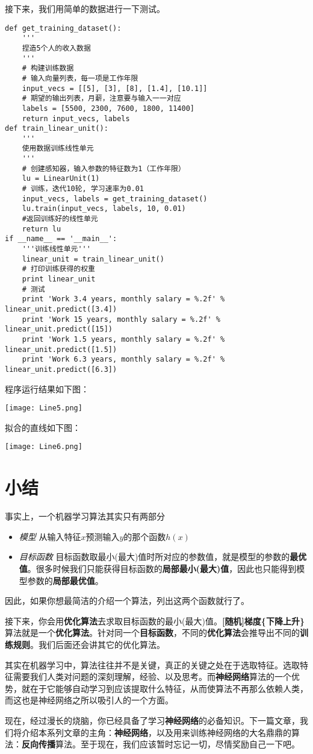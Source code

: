 接下来，我们用简单的数据进行一下测试。
\begin{lstlisting}
def get_training_dataset():
    '''
    捏造5个人的收入数据
    '''
    # 构建训练数据
    # 输入向量列表，每一项是工作年限
    input_vecs = [[5], [3], [8], [1.4], [10.1]]
    # 期望的输出列表，月薪，注意要与输入一一对应
    labels = [5500, 2300, 7600, 1800, 11400]
    return input_vecs, labels    
def train_linear_unit():
    '''
    使用数据训练线性单元
    '''
    # 创建感知器，输入参数的特征数为1（工作年限）
    lu = LinearUnit(1)
    # 训练，迭代10轮, 学习速率为0.01
    input_vecs, labels = get_training_dataset()
    lu.train(input_vecs, labels, 10, 0.01)
    #返回训练好的线性单元
    return lu
if __name__ == '__main__': 
    '''训练线性单元'''
    linear_unit = train_linear_unit()
    # 打印训练获得的权重
    print linear_unit
    # 测试
    print 'Work 3.4 years, monthly salary = %.2f' % linear_unit.predict([3.4])
    print 'Work 15 years, monthly salary = %.2f' % linear_unit.predict([15])
    print 'Work 1.5 years, monthly salary = %.2f' % linear_unit.predict([1.5])
    print 'Work 6.3 years, monthly salary = %.2f' % linear_unit.predict([6.3])
\end{lstlisting}

程序运行结果如下图：

\texttt{[image: Line5.png]}


拟合的直线如下图：

\texttt{[image: Line6.png]}


\section{小结}

事实上，一个机器学习算法其实只有两部分

\begin{itemize}
	\item
	      \emph{模型} 从输入特征\({x}\)预测输入\(y\)的那个函数\(h(x)\)
	\item
	      \emph{目标函数} 目标函数取最小(最大)值时所对应的参数值，就是模型的参数的\textbf{最优值}。很多时候我们只能获得目标函数的\textbf{局部最小(最大)值}，因此也只能得到模型参数的\textbf{局部最优值}。
\end{itemize}

因此，如果你想最简洁的介绍一个算法，列出这两个函数就行了。

接下来，你会用\textbf{优化算法}去求取目标函数的最小(最大)值。\textbf{{[}随机{]}梯度\{下降\textbar 上升\}}算法就是一个\textbf{优化算法}。针对同一个\textbf{目标函数}，不同的\textbf{优化算法}会推导出不同的\textbf{训练规则}。我们后面还会讲其它的优化算法。

其实在机器学习中，算法往往并不是关键，真正的关键之处在于选取特征。选取特征需要我们人类对问题的深刻理解，经验、以及思考。而\textbf{神经网络}算法的一个优势，就在于它能够自动学习到应该提取什么特征，从而使算法不再那么依赖人类，而这也是神经网络之所以吸引人的一个方面。

现在，经过漫长的烧脑，你已经具备了学习\textbf{神经网络}的必备知识。下一篇文章，我们将介绍本系列文章的主角：\textbf{神经网络}，以及用来训练神经网络的大名鼎鼎的算法：\textbf{反向传播}算法。至于现在，我们应该暂时忘记一切，尽情奖励自己一下吧。



